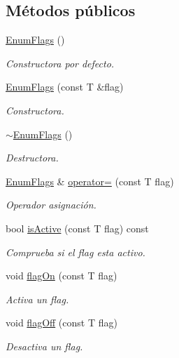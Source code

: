 \subsection*{Métodos públicos}
\begin{DoxyCompactItemize}
\item 
\hyperlink{class_i3_d_1_1_enum_flags_ac69b68a6ce6081514642d173eeed102d}{Enum\+Flags} ()
\begin{DoxyCompactList}\small\item\em Constructora por defecto. \end{DoxyCompactList}\item 
\hyperlink{class_i3_d_1_1_enum_flags_a2ed440f12bf99a06ecfcdba39ff35cc7}{Enum\+Flags} (const T \&flag)
\begin{DoxyCompactList}\small\item\em Constructora. \end{DoxyCompactList}\item 
\hyperlink{class_i3_d_1_1_enum_flags_ad46f4d8a86f71f380d0cbc207aa8a059}{$\sim$\+Enum\+Flags} ()
\begin{DoxyCompactList}\small\item\em Destructora. \end{DoxyCompactList}\item 
\hyperlink{class_i3_d_1_1_enum_flags}{Enum\+Flags} \& \hyperlink{class_i3_d_1_1_enum_flags_a1aec30e83d8a36754cff19fe3987d2ec}{operator=} (const T flag)
\begin{DoxyCompactList}\small\item\em Operador asignación. \end{DoxyCompactList}\item 
bool \hyperlink{class_i3_d_1_1_enum_flags_a5d4b2ff01155f7385cf11a7f77431c2c}{is\+Active} (const T flag) const 
\begin{DoxyCompactList}\small\item\em Comprueba si el flag esta activo. \end{DoxyCompactList}\item 
void \hyperlink{class_i3_d_1_1_enum_flags_a9451d058edccfa1fe8cc7fca5e3a12bc}{flag\+On} (const T flag)
\begin{DoxyCompactList}\small\item\em Activa un flag. \end{DoxyCompactList}\item 
void \hyperlink{class_i3_d_1_1_enum_flags_a642b62c4df660632ba9417eac19c9f4c}{flag\+Off} (const T flag)
\begin{DoxyCompactList}\small\item\em Desactiva un flag. \end{DoxyCompactList}\item 

\end{DoxyCompactItemize}
